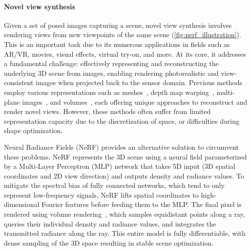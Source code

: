 \paragraph{Novel view synthesis}
Given a set of posed images capturing a scene, novel view synthesis involves rendering views from new viewpoints of the same scene (\cref{fig:nerf_illustration}). This is an important task due to its numerous applications in fields such as AR/VR, movies, visual effects, virtual try-on, and more. At its core, it addresses a fundamental challenge: effectively representing and reconstructing the underlying 3D scene from images, enabling rendering photorealistic and view-consistent images when projected back to the sensor domain. Previous methods employ various representations such as meshes~\cite{buehler2001unstructured,debevec2023modeling}, depth map warping~\cite{chen2023view,shade1998layered}, multi-plane images~\cite{flynn2019deepview,srinivasan2019pushing}, and volumes~\cite{henzler2018single,Lombardi2019,curless1996volumetric}, each offering unique approaches to reconstruct and render novel views. However, these methods often suffer from limited representation capacity due to the discretization of space, or difficulties during shape optimization.

Neural Radiance Fields (NeRF)\cite{mildenhall2020nerf} provides an alternative solution to circumvent these problems. NeRF represents the 3D scene using a neural field parameterized by a Multi-Layer Perceptron (MLP) network that takes 5D input (3D spatial coordinates and 2D view direction) and outputs density and radiance values. To mitigate the spectral bias\cite{tancik2020fourier} of fully connected networks, which tend to only represent low-frequency signals, NeRF lifts spatial coordinates to high-dimensional Fourier features before feeding them to the MLP. The final pixel is rendered using volume rendering~\cite{levoy1990efficient,max1995optical}, which samples equidistant points along a ray, queries their individual density and radiance values, and integrates the transmitted radiance along the ray. This entire model is fully differentiable, with dense sampling of the 3D space resulting in stable scene optimization. 

